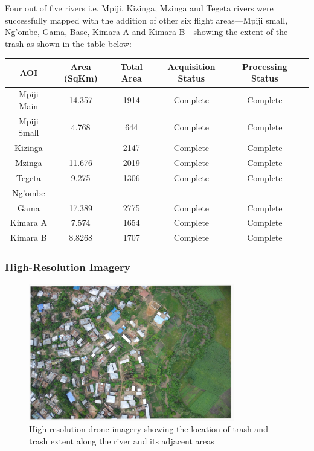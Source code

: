 \documentclass[a4paper,12pt,twoside]{article}
\begin{document}
    Four out of five rivers i.e. Mpiji, Kizinga, Mzinga and Tegeta rivers were successfully mapped with the addition of other six flight areas---Mpiji small, Ng'ombe, Gama, Base, Kimara A and Kimara B---showing the extent of the trash as shown in the table below:

        \begin{center}
          \begin{tabular}{|c|c|c|c|c|c|}  
            \hline
        	\bfseries AOI & \bfseries Area (SqKm) & \bfseries Total Area & \bfseries Acquisition Status & \bfseries Processing Status\\
        	\hline
            Mpiji Main & 14.357 & 1914 & Complete & Complete\\
            \hline
            Mpiji Small & 4.768 & 644 & Complete & Complete\\
            \hline
            Kizinga & & 2147 & Complete & Complete \\
            \hline
            Mzinga & 11.676 & 2019 & Complete & Complete \\
            \hline
            Tegeta & 9.275 & 1306 & Complete & Complete \\
            \hline
            Ng’ombe & & & & \\
            \hline
            Gama & 17.389 & 2775 & Complete & Complete \\
            \hline
            Kimara A & 7.574 & 1654 & Complete & Complete \\
            \hline
            Kimara B & 8.8268 & 1707 & Complete & Complete \\
            \hline
          
          \end{tabular}
        \end{center}
        
    \subsubsection{High-Resolution Imagery}
    
        \begin{figure} %
            \centering
            \includegraphics[width=0.8\textwidth]{images/image1.jpg}
            \caption{High-resolution drone imagery showing the location of trash and trash extent along the river and its adjacent areas}
        \end{figure}
        
\end{document}
